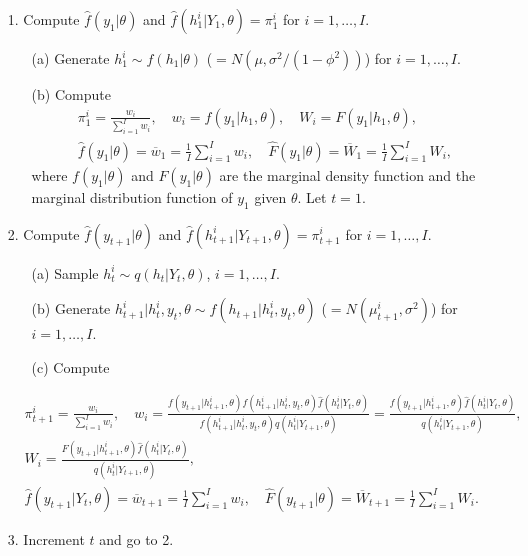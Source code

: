\begin{itemize}
    \item[1.] Compute $\hat{f}(y_1|\theta)$ and $\hat{f}(h_1^i| Y_1, \theta) = \pi_1^i$ for $i = 1, \dots, I$. 
    
    \begin{itemize}
        \item[(a)] Generate $h_1^i \sim f(h_1|\theta)$ ($= N(\mu, \sigma^2/(1-\phi^2))$) for $i = 1, \dots, I$.
        
        \item[(b)] Compute
        \begin{align*}
            &\pi_1^i = \frac{w_i}{\sum_{i=1}^I w_i}, \quad
            w_i = f(y_1|h_1, \theta), \quad 
            W_i = F(y_1|h_1, \theta), \\
            &\hat{f}(y_1|\theta) = \overline{w}_1 = \frac{1}{I} \sum_{i=1}^I w_i, \quad
            \hat{F}(y_1|\theta) = \overline{W}_1 = \frac{1}{I} \sum_{i=1}^I W_i,
        \end{align*}
        where $f(y_1|\theta)$ and $F(y_1|\theta)$ are the marginal density function and the marginal distribution function of $y_1$ given $\theta$. Let $t = 1$.
    \end{itemize}

    \item[2.] Compute $\hat{f}(y_{t+1}|\theta)$ and $\hat{f}(h_{t+1}^i| Y_{t+1}, \theta) = \pi_{t+1}^i$ for $i = 1, \dots, I$.
    
    \begin{itemize}
        \item[(a)] Sample $h_t^i \sim q(h_t| Y_t, \theta)$, $i = 1, \dots, I$.

        \item[(b)] Generate $h_{t+1}^i| h_t^i, y_t, \theta \sim f(h_{t+1}| h_t^i, y_t, \theta)$ ($= N(\mu_{t+1}^i, \sigma^2)$) for $i = 1, \dots, I$.  

        \item[(c)] Compute
    \end{itemize}
       \begin{align*}
            &\pi_{t+1}^i = \frac{w_i}{\sum_{i=1}^I w_i}, \quad
            w_i = \frac{ f(y_{t+1}|h_{t+1}^i, \theta) f(h_{t+1}^i| h_t^i, y_t, \theta) \hat{f}(h_t^i| Y_t, \theta) }{ f(h_{t+1}^i| h_t^i, y_t, \theta) q(h_t^i| Y_{t+1}, \theta) } = \frac{ f(y_{t+1}|h_{t+1}^i, \theta) \hat{f}(h_t^i| Y_t, \theta) }{ q(h_t^i| Y_{t+1}, \theta) }, \\ 
            &W_i = \frac{ F(y_{t+1}|h_{t+1}^i, \theta) \hat{f}(h_t^i| Y_t, \theta) }{ q(h_t^i| Y_{t+1}, \theta) }, \\
            &\hat{f}(y_{t+1}| Y_t, \theta) = \overline{w}_{t+1} = \frac{1}{I} \sum_{i=1}^I w_i, \quad
            \hat{F}(y_{t+1}|\theta) = \overline{W}_{t+1} = \frac{1}{I} \sum_{i=1}^I W_i.
        \end{align*}    

        \item[3.] Increment $t$ and go to 2.
\end{itemize}
